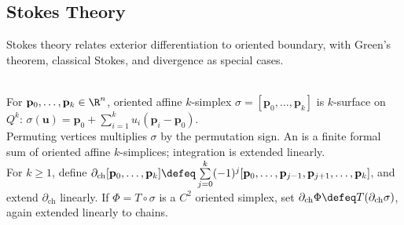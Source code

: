 \subsection{Stokes Theory}

%

Stokes theory relates exterior differentiation to oriented boundary, with Green's theorem, classical Stokes, and divergence as special cases.

\begin{definition} \label{def:affine-chains-and-boundaries} \\
For $\mathbf{p}_0,\ldots,\mathbf{p}_k\in\R^n$, oriented affine $k$-simplex $\sigma=[\mathbf{p}_0,\ldots,\mathbf{p}_k]$ is $k$-surface on $Q^k$: $\sigma(\mathbf{u})=\mathbf{p}_0+\sum\limits_{i=1}^{k}u_i(\mathbf{p}_i-\mathbf{p}_0)$.\\
Permuting vertices multiplies $\sigma$ by the permutation sign. An  is a finite formal sum of oriented affine $k$-simplices; integration is extended linearly.\\
For $k\geq1$, define $\partial_{\mathrm{ch}}[\mathbf{p}_0,\ldots,\mathbf{p}_k] \defeq \sum\limits_{j=0}^{k}(-1)^j[\mathbf{p}_0,\ldots,\mathbf{p}_{j-1},\mathbf{p}_{j+1},\ldots,\mathbf{p}_k]$, and extend $\partial_{\mathrm{ch}}$ linearly. If $\Phi=T\circ\sigma$ is a $C^2$ oriented simplex, set $\partial_{\mathrm{ch}}\Phi\defeq T(\partial_{\mathrm{ch}}\sigma)$, again extended linearly to chains.
\end{definition}

